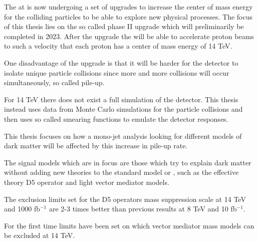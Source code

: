The \abbrLHC at \abbrCERN is now undergoing a set of upgrades to increase the center of mass energy for the colliding particles to be able to explore new physical processes. The focus of this thesis lies on the so called phase II upgrade which will preliminarily be completed in 2023. After the upgrade the \abbrLHC will be able to accelerate proton beams to such a velocity that each proton has a center of mass energy of 14 TeV.

One disadvantage of the upgrade is that it will be harder for the \abbrATLAS detector to isolate unique particle collisions since more and more collisions will occur simultaneously, so called pile-up. 

For 14 TeV there does not exist a full simulation of the \abbrATLAS detector. This thesis instead uses data from Monte Carlo simulations for the particle collisions and then uses so called smearing functions to emulate the detector responses. 

This thesis focuses on how a mono-jet analysis looking for different \abbrWIMP models of dark matter will be affected by this increase in pile-up rate.

The signal models which are in focus are those which try to explain dark matter without adding new theories to the standard model or \abbrQFT , such as the effective theory D5 operator and light vector mediator models.

The exclusion limits set for the D5 operators mass suppression scale at 14 TeV and 1000 fb$^{-1}$ are 2-3 times better than previous results at 8 TeV and 10 fb$^{-1}$. 

For the first time limits have been set on which vector mediator mass models can be excluded at 14 TeV.